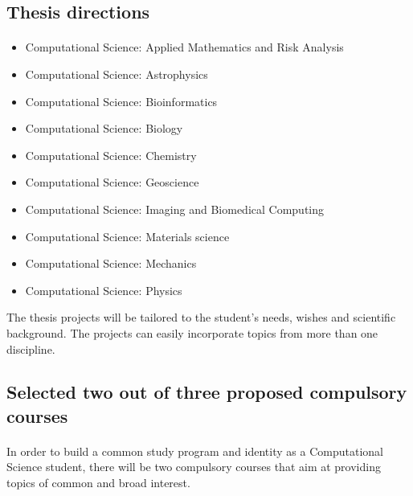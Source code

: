 \documentclass[%
oneside,                 %
final,                   %
10pt]{article}
\begin{document}
\subsection{Thesis directions}

\paragraph{}

\begin{itemize}
\item Computational Science: Applied Mathematics and Risk Analysis

\item Computational Science: Astrophysics

\item Computational Science: Bioinformatics

\item Computational Science: Biology

\item Computational Science: Chemistry

\item Computational Science: Geoscience

\item Computational Science: Imaging and Biomedical Computing

\item Computational Science: Materials science

\item Computational Science: Mechanics

\item Computational Science: Physics
\end{itemize}

\noindent
The thesis projects will be tailored to the student's needs, wishes and scientific background. The projects can easily incorporate topics from more than one discipline.





\subsection{Selected two out of three proposed compulsory courses}

\paragraph{}
In order to build a common study program and identity as a Computational Science student, there will be two compulsory courses that aim at providing topics of common and broad interest.
\end{document}
